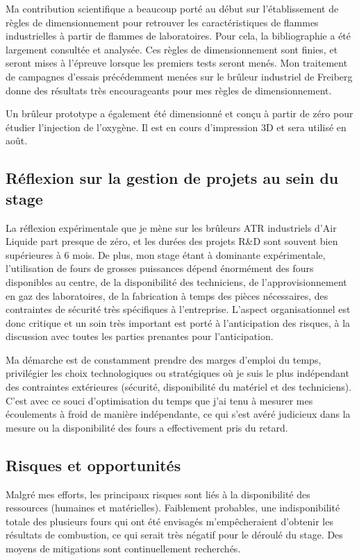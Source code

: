 Ma contribution scientifique a beaucoup porté au début sur l'établissement de règles de dimensionnement pour retrouver les caractéristiques de flammes industrielles à partir de flammes de laboratoires. Pour cela, la bibliographie a été largement consultée et analysée. Ces règles de dimensionnement sont finies, et seront mises à l'épreuve lorsque les premiers tests seront menés. Mon traitement de campagnes d'essais précédemment menées sur le brûleur industriel de Freiberg donne des résultats très encourageants pour mes règles de dimensionnement.

Un brûleur prototype a également été dimensionné et conçu à partir de zéro pour étudier l'injection de l'oxygène. Il est en cours d'impression 3D et sera utilisé en août. 



\subsection{Réflexion sur la gestion de projets au sein du stage}

La réflexion expérimentale que je mène sur les brûleurs ATR industriels d'Air Liquide part presque de zéro, et les durées des projets R\&D sont souvent bien supérieures à 6 mois. De plus, mon stage étant à dominante expérimentale, l'utilisation de fours de grosses puissances dépend énormément des fours disponibles au centre, de la disponibilité des techniciens, de l'approvisionnement en gaz des laboratoires, de la fabrication à temps des pièces nécessaires, des contraintes de sécurité très spécifiques à l'entreprise. L'aspect organisationnel est donc critique et un soin très important est porté à l'anticipation des risques, à la discussion avec toutes les parties prenantes pour l'anticipation.

Ma démarche est de constamment prendre des marges d'emploi du temps, privilégier les choix technologiques ou stratégiques où je suis le plus indépendant des contraintes extérieures (sécurité, disponibilité du matériel et des techniciens). C'est avec ce souci d'optimisation du temps que j'ai tenu à mesurer mes écoulements à froid de manière indépendante, ce qui s'est avéré judicieux dans la mesure ou la disponibilité des fours a effectivement pris du retard.

\subsection{Risques et opportunités}

Malgré mes efforts, les principaux risques sont liés à la disponibilité des ressources (humaines et matérielles). Faiblement probables, une indisponibilité totale des plusieurs fours qui ont été envisagés m'empêcheraient d'obtenir les résultats de combustion, ce qui serait très négatif pour le déroulé du stage. Des moyens de mitigations sont continuellement recherchés.


